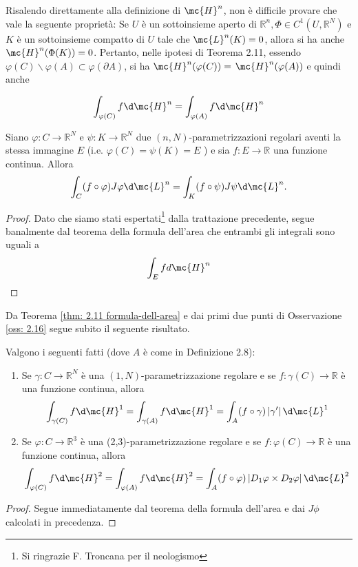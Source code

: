 \begin{oss}\label{oss: 2.19}
    Risalendo direttamente alla definizione di $\mc{H}^{n}$, non è difficile provare che vale la seguente proprietà: Se $U$ è un sottoinsieme aperto di $\mathbb{R}^{n}, \Phi \in C^{1}\left(U, \mathbb{R}^{N}\right)$ e $K$ è un sottoinsieme compatto di $U$ tale che $\mc{L}^{n}(K)=0$, allora si ha anche $\mc{H}^{n}(\Phi(K))=0$. Pertanto, nelle ipotesi di Teorema 2.11, essendo $\varphi(C) \backslash \varphi(A) \subset \varphi(\partial A)$, si ha $\mc{H}^{n}(\varphi(C))=$ $\mc{H}^{n}(\varphi(A))$ e quindi anche

    \[
    \int_{\varphi(C)} f \d \mc{H}^{n}=\int_{\varphi(A)} f \d \mc{H}^{n}
    \]
\end{oss}

\begin{corollary}[$\circ$]
    Siano $\varphi: C \rightarrow \mathbb{R}^{N}$ e $\psi: K \rightarrow \mathbb{R}^{N}$ due $(n, N)$-parametrizzazioni regolari aventi la stessa immagine $E$ (i.e. $\varphi(C)=\psi(K)=E$ ) e sia $f: E \rightarrow \mathbb{R}$ una funzione continua. Allora
    \[\int_{C}(f \circ \varphi) J \varphi \d \mc{L}^{n}=\int_{K}(f \circ \psi) J \psi \d \mc{L}^{n} .\]
\end{corollary}
\begin{proof}
    Dato che siamo stati espertati\footnote{Si ringrazie F. Troncana per il neologismo} dalla trattazione precedente, segue banalmente dal teorema della formula dell'area che entrambi gli integrali sono uguali a 
    \[\int_E f d\mc{H}^n\qedhere\]
\end{proof}
Da Teorema \ref{thm: 2.11 formula-dell-area} e dai primi due punti di Osservazione \ref{oss: 2.16} segue subito il seguente risultato.

\begin{corollary}[$\circ$] Valgono i seguenti fatti (dove $A$ è come in Definizione 2.8):
\begin{enumerate}
    \item Se $\gamma: C \rightarrow \mathbb{R}^{N}$ è una $(1, N)$-parametrizzazione regolare e se $f: \gamma(C) \rightarrow \mathbb{R}$ è una funzione continua, allora
    \[\int_{\gamma(C)} f \d \mc{H}^{1}=\int_{\gamma(A)} f \d \mc{H}^{1}=\int_{A}(f \circ \gamma)\left|\gamma^{\prime}\right| \d \mc{L}^{1}\]
    \item Se $\varphi: C \rightarrow \mathbb{R}^{3}$ è una (2,3)-parametrizzazione regolare e se $f: \varphi(C) \rightarrow \mathbb{R}$ è una funzione continua, allora
    \[\int_{\varphi(C)} f \d \mc{H}^{2}=\int_{\varphi(A)} f \d \mc{H}^{2}=\int_{A}(f \circ \varphi)\left|D_{1} \varphi \times D_{2} \varphi\right| \d \mc{L}^{2}\]
\end{enumerate}
\end{corollary}
\begin{proof}
    Segue immediatamente dal teorema della formula dell'area e dai $J\phi$ calcolati in precedenza.
\end{proof}

